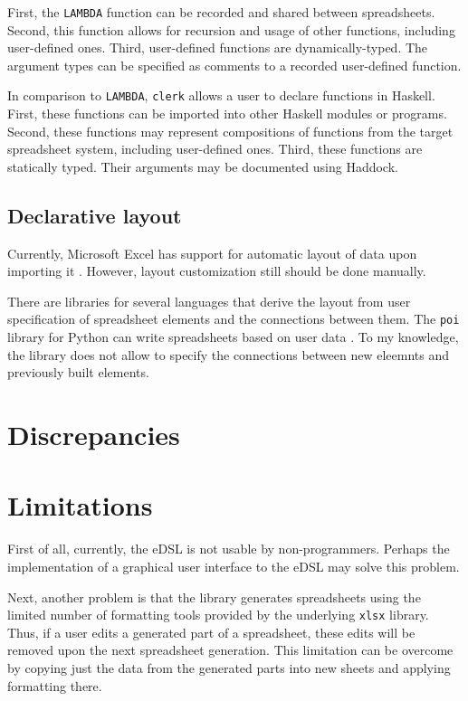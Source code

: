 First, the \texttt{LAMBDA} function can be recorded and shared between spreadsheets.
Second, this function allows for recursion and usage of other functions, including user-defined ones.
Third, user-defined functions are dynamically-typed.
The argument types can be specified as comments to a recorded user-defined function.

In comparison to \texttt{LAMBDA}, \texttt{clerk} allows a user to declare functions in Haskell.
First, these functions can be imported into other Haskell modules or programs.
Second, these functions may represent compositions of functions from the target spreadsheet system, including user-defined ones.
Third, these functions are statically typed. Their arguments may be documented using Haddock.

\subsection{Declarative layout}

Currently, Microsoft Excel has support for automatic layout of data upon importing it \cite{excel_custom_types}.
However, layout customization still should be done manually.

There are libraries for several languages that derive the layout from user specification of spreadsheet elements and the connections between them.
The \texttt{poi} library for Python can write spreadsheets based on user data \cite{wang_poi_nodate}.
To my knowledge, the library does not allow to specify the connections between new eleemnts and previously built elements.



\section{Discrepancies}
\label{eval:discrepancies}

\section{Limitations}
\label{eval:limitations}

First of all, currently, the eDSL is not usable by non-programmers.
Perhaps the implementation of a graphical user interface to the eDSL may solve this problem.

Next, another problem is that the library generates spreadsheets using the limited number of formatting tools provided by the underlying \texttt{xlsx} library.
Thus, if a user edits a generated part of a spreadsheet, these edits will be removed upon the next spreadsheet generation.
This limitation can be overcome by copying just the data from the generated parts into new sheets and applying formatting there.

